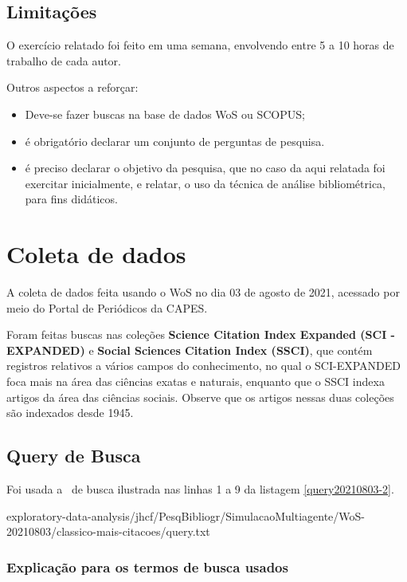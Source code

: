 \subsection{Limitações} O exercício relatado foi feito em uma semana, envolvendo entre 5 a 10 horas de trabalho de cada autor.

Outros aspectos a reforçar:
\begin{itemize}
   
\item Deve-se fazer buscas na base de dados WoS ou SCOPUS;
\item é obrigatório declarar um conjunto de perguntas de pesquisa.
\item é preciso declarar o objetivo da pesquisa, que no caso da aqui relatada foi exercitar inicialmente, e relatar, o uso da técnica de análise bibliométrica, para fins didáticos.
\end{itemize}


\section{Coleta de dados\label{MASSA:coleta}}

A coleta de dados feita usando o WoS no dia 03 de agosto de 2021, acessado por meio do Portal de Periódicos da CAPES.

Foram feitas buscas nas coleções \textbf{Science  Citation  Index  Expanded (SCI -EXPANDED)} e \textbf{Social  Sciences  Citation  Index (SSCI)}, que contém registros relativos a vários campos do conhecimento, no qual o SCI-EXPANDED foca mais na área das ciências exatas e naturais, enquanto que o SSCI indexa artigos da área das ciências sociais. Observe que os artigos nessas duas coleções são indexados desde 1945. 

\subsection{Query de Busca}

Foi usada a \query\  de busca ilustrada nas linhas 1 a 9 da listagem \ref{query20210803-2}.


{exploratory-data-analysis/jhcf/PesqBibliogr/SimulacaoMultiagente/WoS-20210803/classico-mais-citacoes/query.txt}

\subsubsection{Explicação para os termos de busca usados\label{MASSA:query}}

